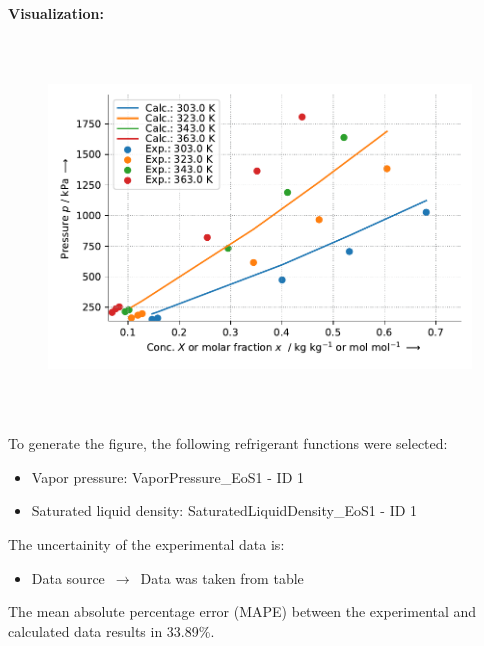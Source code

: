 \textbf{Visualization:}
%
\begin{figure}[!htp]
{\noindent\includegraphics[height=10cm, keepaspectratio]{figs/abs/abs_R-125_lubricant_PEB8_FloryHuggins_1.pdf}}
\end{figure}
%

To generate the figure, the following refrigerant functions were selected:
\begin{itemize}
\item Vapor pressure: VaporPressure\_EoS1 - ID 1
\item Saturated liquid density: SaturatedLiquidDensity\_EoS1 - ID 1
\end{itemize}

The uncertainity of the experimental data is:
\begin{itemize}
\item Data source $\,\to\,$ Data was taken from table
\end{itemize}

The mean absolute percentage error (MAPE) between the experimental and calculated data results in 33.89\%.
\FloatBarrier
\newpage
